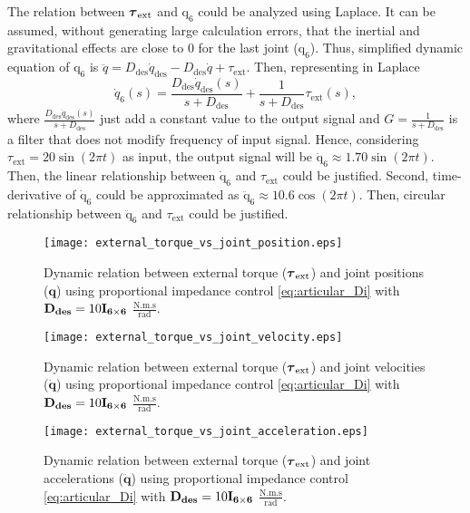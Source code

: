 The relation between $\boldsymbol{\tau}_\mathrm{ext}$ and $\mathrm{q_6}$ could be analyzed using Laplace. It can be assumed, without generating large calculation errors, that the inertial and gravitational effects are close to $0$ for the last joint ($\mathrm{q_6}$). Thus, simplified dynamic equation of $\mathrm{q_6}$ is $\ddot{q}=D_\mathrm{des}\dot{q}_\mathrm{des} - D_\mathrm{des}\dot{q} + \tau_\mathrm{ext}$. Then, representing in Laplace
\begin{equation*}
\dot{q}_{6}(s) = \frac{D_\mathrm{des} \dot{q}_\mathrm{des}(s)}{s + D_\mathrm{des}} + \frac{1}{s + D_\mathrm{des}} \tau_\mathrm{ext}(s), 
\end{equation*}
where $\frac{D_\mathrm{des} \dot{q}_\mathrm{des}(s)}{s + D_\mathrm{des}}$ just add a constant value to the output signal and $G=\frac{1}{s + D_\mathrm{des}}$ is a filter that does not modify frequency of input signal. Hence, considering $\tau_\mathrm{ext}= 20\sin{(2\pi t)}$ as input, the output signal will be $\mathrm{\dot{q}_6}\approx 1.70\sin{(2\pi t)}$. Then, the linear relationship between $\mathrm{\dot{q}_6}$ and $\tau_\mathrm{ext}$ could be justified. Second, time-derivative of $\mathrm{\dot{q}_6}$ could be approximated as $\mathrm{\ddot{q}_6} \approx 10.6\cos{(2\pi t)}$. Then, circular relationship between $\mathrm{\ddot{q}_6}$ and $\tau_\mathrm{ext}$ could be justified. 

\begin{figure}
\centering
\texttt{[image: external\_torque\_vs\_joint\_position.eps]}
\caption{Dynamic relation between external torque ($\boldsymbol{\tau}_\mathrm{ext}$) and joint positions ($\mathbf{q}$) using proportional impedance control \eqref{eq:articular_Di} with $\mathbf{D_{des}}=10\mathbf{I_{6 \times 6}}$ $\mathrm{\frac{N.m.s}{rad}}$.}
\label{fig:act1.1.2_tau_vs_q}
\end{figure}

\begin{figure}
\centering
\texttt{[image: external\_torque\_vs\_joint\_velocity.eps]}
\caption{Dynamic relation between external torque ($\boldsymbol{\tau}_\mathrm{ext}$) and joint velocities ($\mathbf{\dot{q}}$) using proportional impedance control \eqref{eq:articular_Di} with $\mathbf{D_{des}}=10\mathbf{I_{6 \times 6}}$ $\mathrm{\frac{N.m.s}{rad}}$.}
\label{fig:act1.1.2_tau_vs_dq}
\end{figure}

\begin{figure}
\centering
\texttt{[image: external\_torque\_vs\_joint\_acceleration.eps]}
\caption{Dynamic relation between external torque ($\boldsymbol{\tau}_\mathrm{ext}$) and joint accelerations ($\mathbf{\ddot{q}}$) using proportional impedance control \eqref{eq:articular_Di} with $\mathbf{D_{des}}=10\mathbf{I_{6 \times 6}}$ $\mathrm{\frac{N.m.s}{rad}}$.}
\label{fig:act1.1.2_tau_vs_ddq}
\end{figure}



